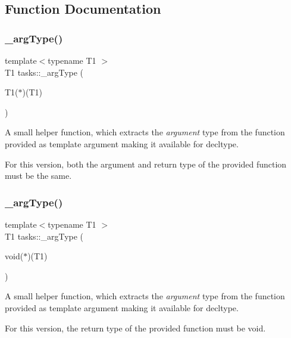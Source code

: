 \subsection{Function Documentation}
\hypertarget{namespacetasks_ac4a797a86584958bef0b67616a38c8ae}{}\label{namespacetasks_ac4a797a86584958bef0b67616a38c8ae} 
\subsubsection{\texorpdfstring{\+\_\+arg\+Type()}{\_argType()}\hspace{0.1cm}{\footnotesize\ttfamily [1/2]}}
{\footnotesize\ttfamily template$<$typename T1 $>$ \\
T1 tasks\+::\+\_\+arg\+Type (\begin{DoxyParamCaption}\item[{T1($\ast$)(T1)}]{ }\end{DoxyParamCaption})}



A small helper function, which extracts the {\itshape argument} type from the function provided as template argument making it available for decltype. 

For this version, both the argument and return type of the provided function must be the same. \hypertarget{namespacetasks_a7950bab5a2847e4ea072b489e93855cb}{}\label{namespacetasks_a7950bab5a2847e4ea072b489e93855cb} 
\subsubsection{\texorpdfstring{\+\_\+arg\+Type()}{\_argType()}\hspace{0.1cm}{\footnotesize\ttfamily [2/2]}}
{\footnotesize\ttfamily template$<$typename T1 $>$ \\
T1 tasks\+::\+\_\+arg\+Type (\begin{DoxyParamCaption}\item[{void($\ast$)(T1)}]{ }\end{DoxyParamCaption})}



A small helper function, which extracts the {\itshape argument} type from the function provided as template argument making it available for decltype. 

For this version, the return type of the provided function must be void. \hypertarget{namespacetasks_acc347173bd59f335faea1d7f1fcae0eb}{}\label{namespacetasks_acc347173bd59f335faea1d7f1fcae0eb} 
